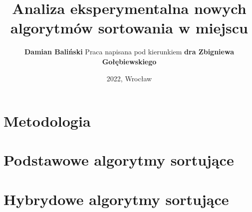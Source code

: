 \documentclass[xcolor=dvipsnames]{beamer}
\title{Analiza eksperymentalna nowych algorytmów sortowania w miejscu}
\author{
	\textbf{Damian Baliński}
	\newline \newline
	Praca napisana pod kierunkiem 
	\newline
	\textbf{dra Zbigniewa Gołębiewskiego}
}
\date{2022, Wrocław}
\begin{document}
\begin{frame}[plain]{}
	\titlepage
\end{frame}

\section{Metodologia}



\section{Podstawowe algorytmy sortujące}



\section{Hybrydowe algorytmy sortujące}








\end{document}
